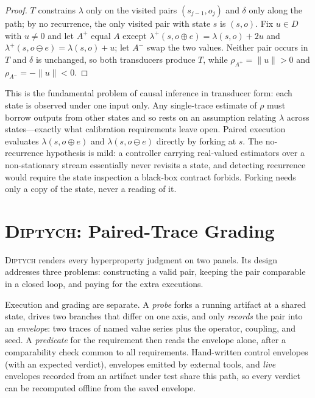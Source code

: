 \documentclass[sigconf,review,anonymous]{acmart}
\newcommand{\sys}{\textsc{Diptych}}
\begin{document}
	\begin{proof}
		$T$ constrains $\lambda$ only on the visited pairs $(s_{j-1}, o_j)$ and
		$\delta$ only along the path; by no recurrence, the only visited pair
		with state $s$ is $(s, o)$. Fix $u \in D$ with $u \neq 0$ and let $A^{+}$
		equal $A$ except $\lambda^{+}(s, o \oplus e) = \lambda(s,o) + 2u$ and
		$\lambda^{+}(s, o \ominus e) = \lambda(s,o) + u$; let $A^{-}$ swap the two
		values. Neither pair occurs in $T$ and $\delta$ is unchanged, so both
		transducers produce $T$, while $\rho_{A^{+}} = \|u\| > 0$ and
		$\rho_{A^{-}} = -\|u\| < 0$.
	\end{proof}
	
	This is the fundamental problem of causal inference \cite{holland1986}
	in transducer form: each state is observed under one input only. Any
	single-trace estimate of $\rho$ must borrow outputs from other states and
	so rests on an assumption relating $\lambda$ across states---exactly
	what calibration requirements leave open. Paired execution evaluates
	$\lambda(s, o \oplus e)$ and $\lambda(s, o \ominus e)$ directly by forking
	at $s$. The no-recurrence hypothesis is mild: a controller carrying
	real-valued estimators over a non-stationary stream essentially never
	revisits a state, and detecting recurrence would require the state
	inspection a black-box contract forbids. Forking needs only a copy of the
	state, never a reading of it.
	
	\section{\sys{}: Paired-Trace Grading}
	\label{sec:harness}
	
	\sys{} renders every hyperproperty judgment on two panels. Its design
	addresses three problems: constructing a valid pair, keeping the pair
	comparable in a closed loop, and paying for the extra executions.
	
	Execution and grading are separate. A \emph{probe} forks a running
	artifact at a shared state, drives two branches that differ on one axis,
	and only \emph{records} the pair into an \emph{envelope}: two traces of
	named value series plus the operator, coupling, and seed. A
	\emph{predicate} for the requirement then reads the envelope alone, after
	a comparability check common to all requirements. Hand-written control
	envelopes (with an expected verdict), envelopes emitted by external
	tools, and \emph{live} envelopes recorded from an artifact under test
	share this path, so every verdict can be recomputed offline from the
	saved envelope.
	
\end{document}
